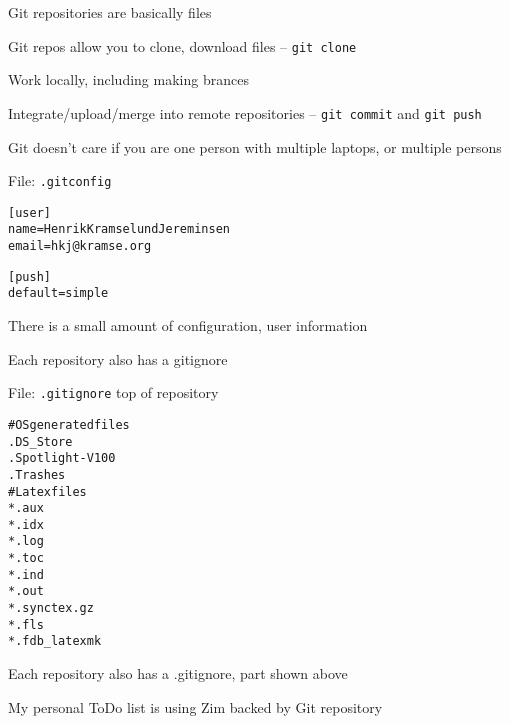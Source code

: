 \documentclass[Screen16to9,17pt]{foils}
\begin{document}

\begin{list2}
\item Git repositories are basically files
\item Git repos allow you to clone, download files -- \verb+git clone+
\item Work locally, including making brances
\item Integrate/upload/merge into remote repositories -- \verb+git commit+ and \verb+git push+
\item Git doesn't care if you are one person with multiple laptops, or multiple persons
\end{list2}





File: \verb+.gitconfig+
\begin{alltt}
  [user]
  	name = Henrik Kramselund Jereminsen
  	email = hkj@kramse.org

  [push]
  	default = simple
\end{alltt}

\begin{list2}
\item There is a small amount of configuration, user information
\item Each repository also has a gitignore
\end{list2}



File: \verb+.gitignore+ top of repository
\begin{alltt}\footnotesize
  # OS generated files
  .DS_Store
  .Spotlight-V100
  .Trashes
  # Latex files
  *.aux
  *.idx
  *.log
  *.toc
  *.ind
  *.out
  *.synctex.gz
  *.fls
  *.fdb_latexmk

\end{alltt}

\begin{list2}
\item Each repository also has a .gitignore, part shown above
\end{list2}





\begin{list2}
\item My personal ToDo list is using Zim backed by Git repository
\item {}
\end{list2}
\end{document}
